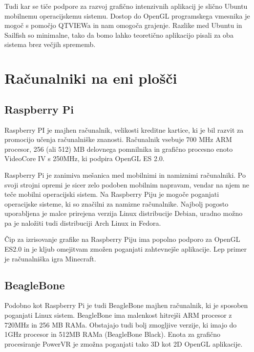 Tudi kar se tiče podpore za razvoj grafično intenzivnih aplikacij je slično Ubuntu mobilnemu operacijskemu sistemu. Dostop do OpenGL programskega vmesnika je mogoč s pomočjo QTVIEWa in nam omogoča grajenje. Razlike med Ubuntu in Sailfish so minimalne, tako da bomo lahko teoretično aplikacijo pisali za oba sistema brez večjih sprememb.

\section{Računalniki na eni plošči}

\subsection{Raspberry Pi}
\label{sec:raspberryPi}

Raspberry PI je majhen računalnik, velikosti kreditne kartice, ki je bil razvit za promocijo učenja računalniške znanosti. Računalnik vsebuje 700 MHz ARM procesor, 256 (ali 512) MB delovnega pomnilnika in grafično procesno enoto VideoCore IV s 250MHz, ki podpira OpenGL ES 2.0.

Raspberry Pi je zanimiva mešanica med mobilnimi in namiznimi računalniki. Po svoji strojni opremi je sicer zelo podoben mobilnim napravam, vendar na njem ne teče mobilni operacijski sistem. Na Raspberry Piju je mogoče poganjati operacijske sisteme, ki so značilni za namizne računalnike. Najbolj pogosto uporabljena je malce prirejena verzija Linux distribucije Debian, uradno možno pa je naložiti tudi distribuciji Arch Linux in Fedora.

Čip za izrisovanje grafike na Raspberry Piju ima popolno podporo za OpenGL ES2.0 in je kljub omejitvam zmožen poganjati zahtevnejše aplikacije.  Lep primer je računalniška igra Minecraft.


\subsection{BeagleBone}
\label{sec:beagleBone}

Podobno kot Raspberry Pi je tudi BeagleBone majhen računalnik, ki je sposoben poganjati Linux sistem. BeagleBone ima malenkost hitrejši ARM procesor z 720MHz in 256 MB RAMa. Obstajajo tudi bolj zmogljive verzije, ki imajo do 1GHz procesor in 512MB RAMa (BeagleBone Black). Enota za grafično procesiranje PowerVR je zmožna poganjati tako 3D kot 2D OpenGL aplikacije.

